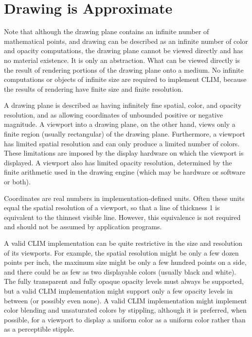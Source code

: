 \section {Drawing is Approximate}

Note that although the drawing plane contains an infinite number of mathematical
points, and drawing can be described as an infinite number of color and opacity
computations, the drawing plane cannot be viewed directly and has no material
existence.  It is only an abstraction.  What can be viewed directly is the
result of rendering portions of the drawing plane onto a medium.  No infinite
computations or objects of infinite size are required to implement CLIM, because
the results of rendering have finite size and finite resolution.

A drawing plane is described as having infinitely fine spatial, color, and
opacity resolution, and as allowing coordinates of unbounded positive or
negative magnitude.  A viewport into a drawing plane, on the other hand, views
only a finite region (usually rectangular) of the drawing plane.  Furthermore, a
viewport has limited spatial resolution and can only produce a limited number of
colors.  These limitations are imposed by the display hardware on which the
viewport is displayed.  A viewport also has limited opacity resolution,
determined by the finite arithmetic used in the drawing engine (which may be
hardware or software or both).

Coordinates are real numbers in implementation-defined units.  Often these units
equal the spatial resolution of a viewport, so that a line of thickness 1 is
equivalent to the thinnest visible line.  However, this equivalence is not
required and should not be assumed by application programs.

A valid CLIM implementation can be quite restrictive in the size and resolution
of its viewports.  For example, the spatial resolution might be only a few dozen
points per inch, the maximum size might be only a few hundred points on a side,
and there could be as few as two displayable colors (usually black and white).
The fully transparent and fully opaque opacity levels must always be supported,
but a valid CLIM implementation might support only a few opacity levels in
between (or possibly even none).  A valid CLIM implementation might implement
color blending and unsaturated colors by stippling, although it is preferred,
when possible, for a viewport to display a uniform color as a uniform color
rather than as a perceptible stipple.

